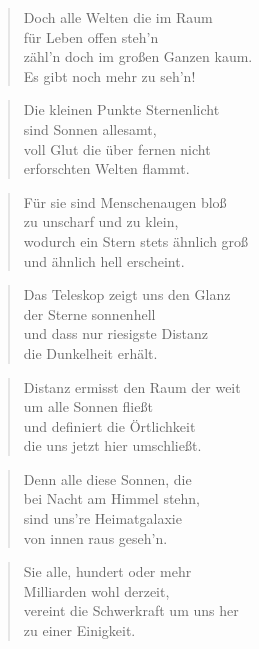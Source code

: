 \documentclass[10pt,a4paper]{article}
\begin{document}
\begin{multicols}{2}
\begin{verse}
Doch alle Welten die im Raum \\
für Leben offen steh’n \\
zähl’n doch im großen Ganzen kaum. \\
Es gibt noch mehr zu seh’n! \\
\end{verse}

\begin{verse}
Die kleinen Punkte Sternenlicht \\
sind Sonnen allesamt, \\
voll Glut die über fernen nicht \\
erforschten Welten flammt. \\
\end{verse}

\begin{verse}
Für sie sind Menschenaugen bloß \\
zu unscharf und zu klein, \\
wodurch ein Stern stets ähnlich groß \\
und ähnlich hell erscheint. \\
\end{verse}

\begin{verse}
Das Teleskop zeigt uns den Glanz \\
der Sterne sonnenhell \\
und dass nur riesigste Distanz \\
die Dunkelheit erhält. \\
\end{verse}

\begin{verse}
Distanz ermisst den Raum der weit \\
um alle Sonnen fließt \\
und definiert die Örtlichkeit \\
die uns jetzt hier umschließt. \\
\end{verse}

\begin{verse}
Denn alle diese Sonnen, die \\
bei Nacht am Himmel stehn, \\
sind uns’re Heimatgalaxie \\
von innen raus geseh’n. \\
\end{verse}

\begin{verse}
Sie alle, hundert oder mehr \\
Milliarden wohl derzeit, \\
vereint die Schwerkraft um uns her \\
zu einer Einigkeit. \\
\end{verse}


\end{multicols}
\end{document}

